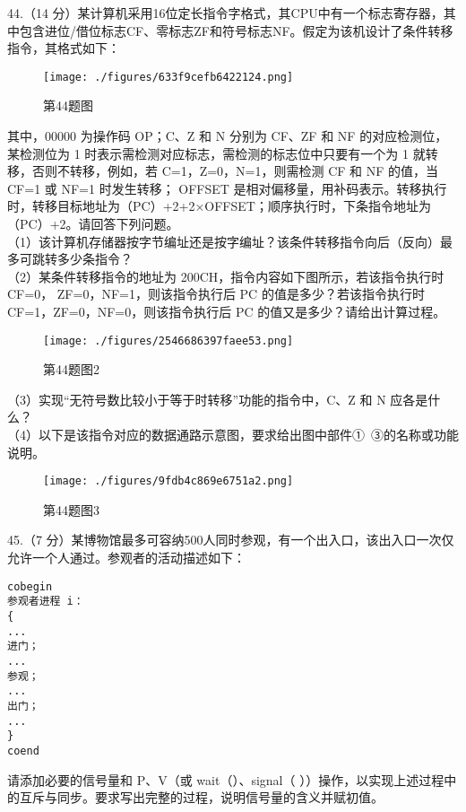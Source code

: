 44.（14 分）某计算机采用16位定长指令字格式，其CPU中有一个标志寄存器，其中包含进位/借位标志CF、零标志ZF和符号标志NF。假定为该机设计了条件转移指令，其格式如下：
\begin{figure}[ht]
\centering
\texttt{[image: ./figures/633f9cefb6422124.png]}
\caption{第44题图} \label{fig_CSN13_5}
\end{figure}
 其中，00000 为操作码 OP；C、Z 和 N 分别为 CF、ZF 和 NF 的对应检测位，某检测位为 1 时表示需检测对应标志，需检测的标志位中只要有一个为 1 就转移，否则不转移，例如，若 C=1，Z=0，N=1，则需检测 CF 和 NF 的值，当 CF=1 或 NF=1 时发生转移； OFFSET 是相对偏移量，用补码表示。转移执行时，转移目标地址为（PC）+2+2×OFFSET；顺序执行时，下条指令地址为（PC）+2。请回答下列问题。  \\
（1）该计算机存储器按字节编址还是按字编址？该条件转移指令向后（反向）最多可跳转多少条指令？ \\
（2）某条件转移指令的地址为 200CH，指令内容如下图所示，若该指令执行时 CF=0， ZF=0，NF=1，则该指令执行后 PC 的值是多少？若该指令执行时 CF=1，ZF=0，NF=0，则该指令执行后 PC 的值又是多少？请给出计算过程。 \\
\begin{figure}[ht]
\centering
\texttt{[image: ./figures/2546686397faee53.png]}
\caption{第44题图2} \label{fig_CSN13_6}
\end{figure}
（3）实现“无符号数比较小于等于时转移”功能的指令中，C、Z 和 N 应各是什么？  \\
（4）以下是该指令对应的数据通路示意图，要求给出图中部件①~③的名称或功能说明。  \\
\begin{figure}[ht]
\centering
\texttt{[image: ./figures/9fdb4c869e6751a2.png]}
\caption{第44题图3} \label{fig_CSN13_7}
\end{figure}

45.（7 分）某博物馆最多可容纳500人同时参观，有一个出入口，该出入口一次仅允许一个人通过。参观者的活动描述如下：    
\begin{lstlisting}[language=none]
cobegin 
参观者进程 i： 
{ 
...
进门；
...
参观；
...
出门；
...
}
coend 
\end{lstlisting}
请添加必要的信号量和 P、V（或 wait（）、signal（ ））操作，以实现上述过程中的互斥与同步。要求写出完整的过程，说明信号量的含义并赋初值。

